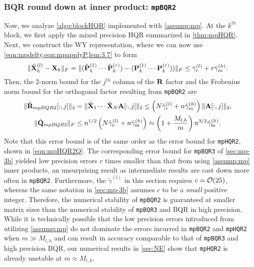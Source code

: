 \subsubsection{BQR round down at inner product: {\tt mpBQR2}}
Now, we analyze \cref{algo:blockHQR} implemented with \cref{assump:mp}. 
At the $k^{th}$ block, we first apply the mixed precision HQR summarized in \cref{thm:mpHQR}.
Next, we construct the WY representation, where we can now use \cref{eqn:mpdelty,eqn:mpapplyP,lem:3.7} to form
\begin{equation}
	\|\hat{\mathbf{X}}_{k}^{(l)}- \mathbf{X}_k\|_F = \|(\hat{\mathbf{P}}_k^{(1)}\cdots \hat{\mathbf{P}}_k^{(r)})-(\mathbf{P}_k^{(1)}\cdots \mathbf{P}_k^{(r)}))\|_F \leq \tilde{\gamma}_{r}^{(l)} + r\tilde{\gamma}_{m}^{(h)}.
\end{equation}
Then, the 2-norm bound for the $j^{th}$ column of the $\mathbf{R}$ factor and the Frobenius norm bound for the orthogonal factor resulting from {\tt mpBQR2} are
\begin{align}
	\|\hat{\bb{R}}_{mpBQR2}[:,j]\|_2 &= \|\hat{\bb{X}}_1\cdots\hat{\bb{X}}_N\bb{A}[:,j]\|_2\leq\left( N\tilde{\gamma}_{r}^{(l)} + n\tilde{\gamma}_{m}^{(h)}\right)\|\bb{A}[:,j]\|_2,\\
	\|\hat{\bb{Q}}_{mpBQR2}\|_F &\leq n^{1/2}\left(N\tilde{\gamma}_{r}^{(l)} + n\tilde{\gamma}_{m}^{(h)}\right) \approx \left(1+\frac{M_{l,h}}{m}\right)n^{3/2}\tilde{\gamma}_{m}^{(h)}. \label{eqn:mpBQR2}
\end{align}
Note that this error bound is of the same order as the error bound for {\tt mpHQR2}, shown in \cref{eqn:mpHQR2Q}.
The corresponding error bound for {\tt mpBQR3} of \cref{sec:mp-3b} yielded low precision errors $r$ times smaller than that from 
using \cref{assump:mp} inner products,
 an unsurprising result as intermediate results are cast down more often in {\tt mpBQR2}.
Furthermore, the $\tilde{\gamma}^{(l)}$ in this section requires $c=\mathcal{O}(25)$, whereas the same notation in \cref{sec:mp-3b} assumes $c$ to be a \emph{small} positive integer.
Therefore, the numerical stability of {\tt mpBQR2} is guaranteed at smaller matrix sizes than the numerical stability of {\tt mpBQR3} and BQR in high precision.
While it is technically possible that the low precision errors introduced from utilizing \cref{assump:mp} do not dominate the errors incurred in {\tt mpBQR2} and {\tt mpHQR2} when $m\gg M_{l,h}$ and can result in accuracy comparable to that of {\tt mpBQR3} and high precision BQR, our numerical results in \cref{sec:NE} show that {\tt mpHQR2} is already unstable at $m\approx M_{l,h}$.

